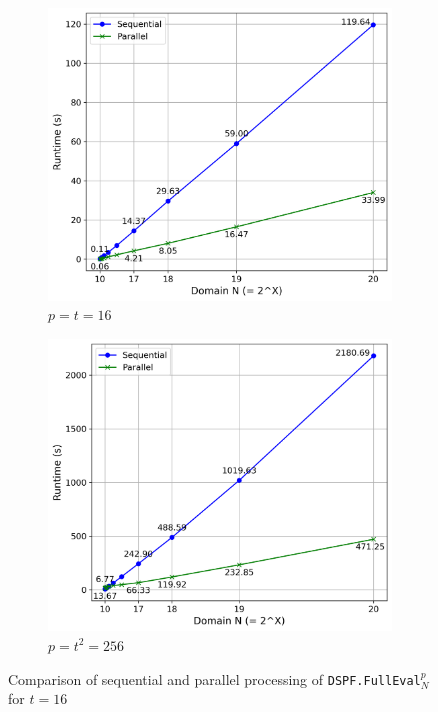 \begin{figure}[h!]
    \hspace{-1em}
    \begin{subfigure}[b]{0.5\textwidth}
        \centering
        \includegraphics[scale=0.49]{images/plots/full_eval_t16.png}
        \caption{$p=t=16$}
    \end{subfigure}
    \hspace{0em}
    \begin{subfigure}[b]{0.5\textwidth}
        \centering
        \includegraphics[scale=0.49]{images/plots/full_eval_t256.png}
        \caption{$p =t^2=256$}
    \end{subfigure}
    \label{fig:fullEvalChart}
    \caption{Comparison of sequential and parallel processing of \texttt{DSPF.FullEval}$_N^p$ for $t=16$}
\end{figure}

